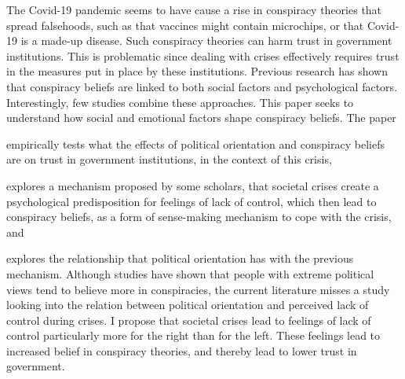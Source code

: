 The Covid-19 pandemic seems to have cause a rise in conspiracy theories that spread falsehoods, such as that vaccines might contain microchips, or that Covid-19 is a made-up disease. 
Such conspiracy theories can harm trust in government institutions. This is problematic since dealing with crises effectively requires trust in the measures put in place by these institutions.
Previous research has shown that conspiracy beliefs are linked to both social factors and psychological factors. Interestingly, few studies combine these approaches. 
This paper seeks to understand how social and emotional factors shape conspiracy beliefs.
The paper
\begin{seriate}
    \item empirically tests what the effects of political orientation and conspiracy beliefs are on trust in government institutions, in the context of this crisis, 
    \item explores a mechanism proposed by some scholars, that societal crises create a psychological predisposition for feelings of lack of control, which then lead to conspiracy beliefs, as a form of sense-making mechanism to cope with the crisis, and
    \item explores the relationship that political orientation has with the previous mechanism. Although studies have shown that people with extreme political views tend to believe more in conspiracies, the current literature misses a study looking into the relation between political orientation and perceived lack of control during crises. I propose that societal crises lead to feelings of lack of control particularly more for the right than for the left. These feelings lead to increased belief in conspiracy theories, and thereby lead to lower trust in government.
\end{seriate}

